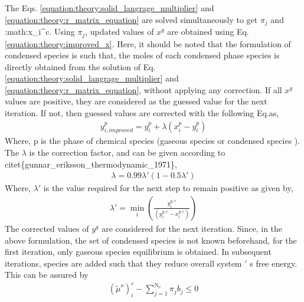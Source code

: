 \documentclass[letterpaper,10pt,english]{sphinxmanual}
\begin{document}
The Eqs. \eqref{equation:theory:solid_langrage_multiplier} and \eqref{equation:theory:r_matrix_equation} are
solved simultaneously to get \(\pi _j\) and :math:x\_i\textasciicircum{}c. Using
\(\pi _j\), updated values of \(x^g\) are obtained
using Eq. \eqref{equation:theory:improved_x}. Here, it should be noted that the formulation of
condensed species is such that, the moles of each condensed phase species is
directly obtained from the solution of Eq. \eqref{equation:theory:solid_langrage_multiplier} and
\eqref{equation:theory:r_matrix_equation}, without applying any correction.
If all \(x^g\) values are positive, they are considered as the guessed value for the next iteration. If not, then guessed values are corrected with the following Eq.as,
\begin{equation}\label{equation:theory:y_i_improved}
\begin{split}y_{i, improved}^{p} = y^{p}_{i} + \lambda (x^{p}_{i} - y^{p}_{i})\end{split}
\end{equation}
Where, p is the phase of chemical species (gaseous
species  or condensed species ). The \(\lambda\) is
the correction factor, and can be given according
to citet\{gunnar\_eriksson\_thermodynamic\_1971\},
\begin{equation}\label{equation:theory:lambda}
\begin{split}\lambda = 0.99 \lambda ' (1 - 0.5 \lambda ')\end{split}
\end{equation}
Where, \(\lambda '\) is the value required for the next step to
remain positive as given by,
\begin{equation}\label{equation:theory:lambda_dash}
\begin{split}\lambda ' = \min_{i}\left(\frac{y^{g,c}_{i} }{(y^{g,c}_{i} - x^{g,c}_{i})}
\right)\end{split}
\end{equation}
The corrected values of \(y^g\) are considered for the next
iteration. Since, in the above formulation, the set of condensed species is
not known beforehand, for the first iteration, only gaseous species
equilibrium is obtained. In subsequent iterations, species are added such that
they reduce overall system \('\) s free energy. This can be assured by
\begin{equation}\label{equation:theory:test_for_condesed_sp}
\begin{split}{\left(\tilde{\mu}^o\right)}_i^c -
\sum_{j=1}^{\mathrm{N_e}}\pi_{j}b_{j} \le 0\end{split}
\end{equation}
\end{document}
